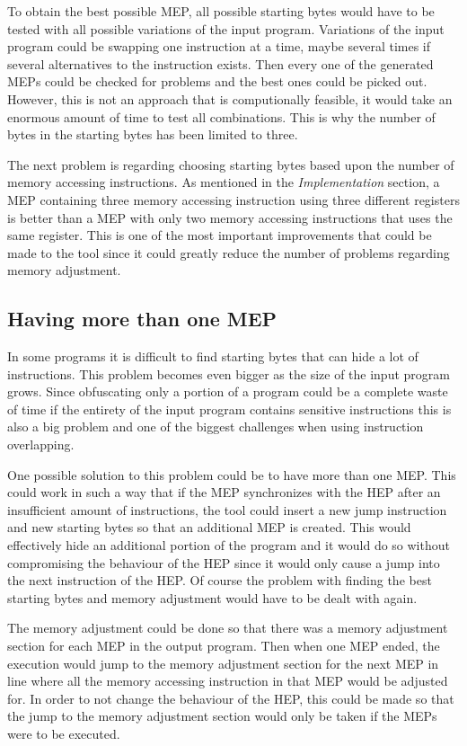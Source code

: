 \documentclass[11pt,twoside]{eitExjobb}
\begin{document}
To obtain the best possible MEP, all possible starting bytes would have to be tested with all possible variations of the input program. Variations of the input program could be swapping one instruction at a time, maybe several times if several alternatives to the instruction exists. Then every one of the generated MEPs could be checked for problems and the best ones could be picked out. However, this is not an approach that is computionally feasible, it would take an enormous amount of time to test all combinations. This is why the number of bytes in the starting bytes has been limited to three.

The next problem is regarding choosing starting bytes based upon the number of memory accessing instructions. As mentioned in the \emph{Implementation} section, a MEP containing three memory accessing instruction using three different registers is better than a MEP with only two memory accessing instructions that uses the same register. This is one of the most important improvements that could be made to the tool since it could greatly reduce the number of problems regarding memory adjustment.

\subsection{Having more than one MEP}
In some programs it is difficult to find starting bytes that can hide a lot of instructions. This problem becomes even bigger as the size of the input program grows. Since obfuscating only a portion of a program could be a complete waste of time if the entirety of the input program contains sensitive instructions this is also a big problem and one of the biggest challenges when using instruction overlapping.

One possible solution to this problem could be to have more than one MEP. This could work in such a way that if the MEP synchronizes with the HEP after an insufficient amount of instructions, the tool could insert a new jump instruction and new starting bytes so that an additional MEP is created. This would effectively hide an additional portion of the program and it would do so without compromising the behaviour of the HEP since it would only cause a jump into the next instruction of the HEP. Of course the problem with finding the best starting bytes and memory adjustment would have to be dealt with again.

The memory adjustment could be done so that there was a memory adjustment section for each MEP in the output program. Then when one MEP ended, the execution would jump to the memory adjustment section for the next MEP in line where all the memory accessing instruction in that MEP would be adjusted for. In order to not change the behaviour of the HEP, this could be made so that the jump to the memory adjustment section would only be taken if the MEPs were to be executed. 
\end{document}
